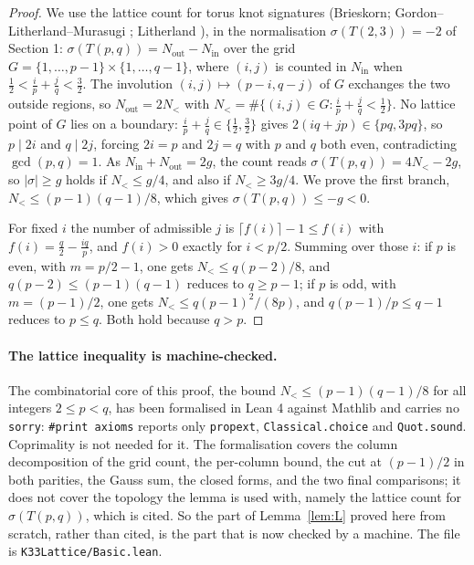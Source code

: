 \documentclass[11pt]{article}
\theoremstyle{definition}
\begin{document}
\begin{proof}
We use the lattice count for torus knot signatures (Brieskorn; Gordon--Litherland--Murasugi \cite{GLM};
Litherland \cite{Lith}), in the normalisation $\sigma(T(2,3)) = -2$ of Section 1:
$\sigma(T(p,q)) = N_{\mathrm{out}} - N_{\mathrm{in}}$ over the
grid $G = \{1,\dots,p-1\}\times\{1,\dots,q-1\}$, where $(i,j)$ is counted in $N_{\mathrm{in}}$ when
$\tfrac12 < \tfrac ip + \tfrac jq < \tfrac32$. The involution $(i,j) \mapsto (p-i,q-j)$ of $G$ exchanges the two
outside regions, so $N_{\mathrm{out}} = 2N_{<}$ with $N_{<} = \#\{(i,j) \in G : \tfrac ip + \tfrac jq < \tfrac12\}$.
No lattice point of $G$ lies on a boundary: $\tfrac ip + \tfrac jq \in \{\tfrac12, \tfrac32\}$ gives
$2(iq + jp) \in \{pq, 3pq\}$, so $p \mid 2i$ and $q \mid 2j$, forcing $2i = p$ and $2j = q$ with $p$ and $q$ both even,
contradicting $\gcd(p,q) = 1$. As $N_{\mathrm{in}} + N_{\mathrm{out}} = 2g$, the count reads $\sigma(T(p,q)) = 4N_{<} - 2g$, so $|\sigma| \ge g$
holds if $N_{<} \le g/4$, and also if $N_{<} \ge 3g/4$. We prove the first branch,
$N_{<} \le (p-1)(q-1)/8$, which gives $\sigma(T(p,q)) \le -g < 0$.

For fixed $i$ the number of admissible $j$ is $\lceil f(i)\rceil - 1 \le f(i)$ with $f(i) = \tfrac q2 - \tfrac{iq}{p}$,
and $f(i) > 0$ exactly for $i < p/2$. Summing over those $i$:
if $p$ is even, with $m = p/2-1$, one gets $N_{<} \le q(p-2)/8$, and $q(p-2) \le (p-1)(q-1)$ reduces to $q \ge p-1$;
if $p$ is odd, with $m = (p-1)/2$, one gets $N_{<} \le q(p-1)^2/(8p)$, and $q(p-1)/p \le q-1$ reduces to $p \le q$.
Both hold because $q > p$.
\end{proof}

\paragraph{The lattice inequality is machine-checked.} The combinatorial core of this proof, the bound
$N_{<} \le (p-1)(q-1)/8$ for all integers $2 \le p < q$, has been formalised in Lean 4 against Mathlib
and carries no \texttt{sorry}: \texttt{\#print axioms} reports only \texttt{propext},
\texttt{Classical.choice} and \texttt{Quot.sound}. Coprimality is not needed for it. The formalisation
covers the column decomposition of the grid count, the per-column bound, the cut at $(p-1)/2$ in both
parities, the Gauss sum, the closed forms, and the two final comparisons; it does not cover the topology
the lemma is used with, namely the lattice count for $\sigma(T(p,q))$, which is cited. So the part of
Lemma~\ref{lem:L} proved here from scratch, rather than cited, is the part that is now checked by a
machine. The file is \texttt{K33Lattice/Basic.lean}.
\end{document}
